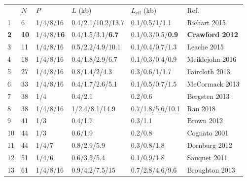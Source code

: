 \documentclass[10pt,letterpaper]{article}
\begin{document}
\begin{table}[h!]
\centering
\begin{tabular}{|l| l l l l l|} 
 \hline
  & $N$ & $P$ & $L$ (kb) & $L_\text{eff}$ (kb) & Ref. \\
 
 1  &  6  &  1/4/8/16  &  0.4/2.1/10.2/13.7  &  0.1/0.5/1/1.1  &  Richart 2015 \cite{Richart_2016} \\ 

\textbf{2}  &  \textbf{10}  &  1/4/8/\textbf{16}  &  0.4/1.5/3.1/\textbf{6.7}  &  0.1/0.3/0.5/\textbf{0.9}  &  \textbf{Crawford 2012} \cite{Crawford_2012} \\ 

3  &  11  &  1/4/8/16  &  0.5/2.2/4.9/10.1  &  0.1/0.4/0.7/1.3  &  Leache 2015 \cite{Leache_2015} \\ 

4  &  18  &  1/4/8/16  &  0.4/1.8/2.9/6.7  &  0.1/0.3/0.4/0.9  &  Meiklejohn 2016 \cite{Meiklejohn_2016} \\ 

5  &  27  &  1/4/8/16  &  0.8/1.4/2/4.3  &  0.3/0.6/1/1.7  &  Faircloth 2013 \cite{Faircloth_2013} \\ 

6  &  33  &  1/4/8/16  &  0.4/1.7/2.6/5.1  &  0.1/0.5/0.7/1.5  &  McCormack 2013 \cite{McCormack_2013} \\ 

7  &  38  &  1/4  &  0.4/2.1  &  0.2/0.6  &  Bergsten 2013 \cite{Bergsten_2013} \\ 

8  &  38  &  1/4/8/16  &  1/2.4/8.1/14.9  &  0.7/1.8/5.6/10.1  &  Ran 2018 \cite{Ran_2018} \\ 

9  &  41  &  1/3  &  0.4/1.7  &  0.3/1.1  &  Brown 2012 \cite{Brown_2012} \\ 

10  &  44  &  1/3  &  0.6/1.9  &  0.2/0.8  &  Cognato 2001 \cite{Cognato_2001} \\ 

11  &  44  &  1/4/7  &  0.8/2.9/5.9  &  0.3/0.8/1.8  &  Dornburg 2012 \cite{Dornburg_2012} \\ 

12  &  51  &  1/4/6  &  0.6/3.5/5.4  &  0.1/0.9/1.8  &  Sauquet 2011 \cite{Sauquet_2011} \\ 

13  &  61  &  1/4/8/16  &  0.9/4.2/7.5/15  &  0.7/2.8/4.6/9.6  &  Broughton 2013 \cite{Broughton_2013} \\ 


\end{tabular}
\end{table}
\end{document}
